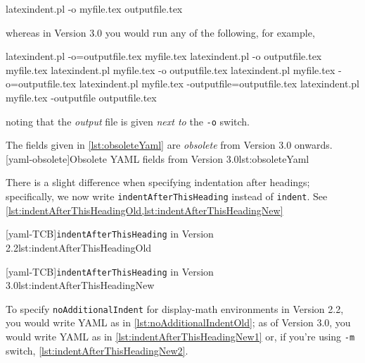 \documentclass[10pt]{article}
\begin{document}
  \begin{commandshell}
latexindent.pl -o myfile.tex outputfile.tex
\end{commandshell}

  whereas in Version 3.0 you would run any of the following, for example,

  \begin{commandshell}
latexindent.pl -o=outputfile.tex myfile.tex
latexindent.pl -o outputfile.tex myfile.tex
latexindent.pl myfile.tex -o outputfile.tex
latexindent.pl myfile.tex -o=outputfile.tex
latexindent.pl myfile.tex -outputfile=outputfile.tex
latexindent.pl myfile.tex -outputfile outputfile.tex
\end{commandshell}

  noting that the \emph{output} file is given \emph{next to} the \texttt{-o} switch.

  The fields given in \cref{lst:obsoleteYaml} are \emph{obsolete} from Version 3.0
  onwards.
  [yaml-obsolete]{Obsolete YAML fields from Version 3.0}{lst:obsoleteYaml}

  There is a slight difference when specifying indentation after headings; specifically,
  we now write \texttt{indentAfterThisHeading} instead of \texttt{indent}. See
  \cref{lst:indentAfterThisHeadingOld,lst:indentAfterThisHeadingNew}

  \begin{minipage}{.45\textwidth}
   [yaml-TCB]{\texttt{indentAfterThisHeading} in Version 2.2}{lst:indentAfterThisHeadingOld}
  \end{minipage}%
  \hfill
  \begin{minipage}{.45\textwidth}
   [yaml-TCB]{\texttt{indentAfterThisHeading} in Version 3.0}{lst:indentAfterThisHeadingNew}
  \end{minipage}%

  To specify \texttt{noAdditionalIndent} for display-math environments in Version 2.2,
  you would write YAML as in \cref{lst:noAdditionalIndentOld}; as of Version 3.0, you
  would write YAML as in \cref{lst:indentAfterThisHeadingNew1} or, if you're using
  \texttt{-m} switch, \cref{lst:indentAfterThisHeadingNew2}.
\end{document}
